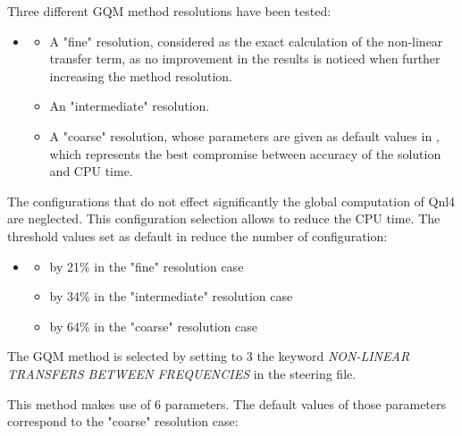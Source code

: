  Three different GQM method resolutions have been tested:

\begin{itemize}
\item \begin{itemize}
\item  A "fine" resolution, considered as the exact calculation of the non-linear transfer term, as no improvement in the results is noticed when further increasing the method resolution.

\item  An "intermediate" resolution.

\item  A "coarse" resolution, whose parameters are given as default values in \tomawac, which represents the best compromise between accuracy of the solution and CPU time.
\end{itemize}
\end{itemize}

 The configurations that do not effect significantly the global computation of Qnl4 are neglected. This configuration selection allows to reduce the CPU time. The threshold values set as default in \tomawac reduce the number of configuration:

\begin{itemize}
\item \begin{itemize}
\item  by 21\% in the "fine" resolution case

\item  by 34\% in the "intermediate" resolution case

\item  by 64\% in the "coarse" resolution case
\end{itemize}
\end{itemize}

 The GQM method is selected by setting to 3 the keyword \textit{NON-LINEAR TRANSFERS BETWEEN FREQUENCIES} in the steering file.\textbf{}

 This method makes use of 6 parameters. The default values of those parameters correspond to the "coarse" resolution case:

